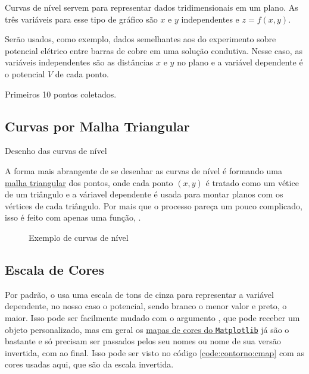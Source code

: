 Curvas de nível servem para representar dados tridimensionais em um plano. As três variáveis para esse tipo de gráfico são $x$ e $y$ independentes e $z = f(x,y)$.

Serão usados, como exemplo, dados semelhantes aos do experimento sobre potencial elétrico entre barras de cobre em uma solução condutiva. Nesse caso, as variáveis independentes são as distâncias $x$ e $y$ no plano e a variável dependente é o potencial $V$ de cada ponto.

\begin{table}[H]
    \centering
    
    \caption{Primeiros 10 pontos coletados.}
    \label{tab:contorno:dados}
\end{table}


\subsection{Curvas por Malha Triangular}
    \begin{listing}[H]
        \caption{Desenho das curvas de nível}
        \label{code:contorno:base}

    \end{listing}

    A forma mais abrangente de se desenhar as curvas de nível é formando uma \href{https://www.wikiwand.com/pt/Malha_triangular}{malha triangular} dos pontos, onde cada ponto $(x, y)$ é tratado como um vétice de um triângulo e a váriavel dependente é usada para montar planos com os vértices de cada triângulo. Por mais que o processo pareça um pouco complicado, isso é feito com apenas uma função, .

    \begin{figure}[H]
        \centering
        

        \caption{Exemplo de curvas de nível}
        \label{fig:contorno:base}
    \end{figure}


\subsection{Escala de Cores} \label{sec:contorno:cmap}

    Por padrão, o  usa uma escala de tons de cinza para representar a variável dependente, no nosso caso o potencial, sendo branco o menor valor e preto, o maior. Isso pode ser facilmente mudado com o argumento , que pode receber um objeto  personalizado, mas em geral os \href{https://matplotlib.org/3.1.0/gallery/color/colormap_reference.html}{mapas de cores do \texttt{Matplotlib}} já são o bastante e só precisam ser passados pelos seu nomes ou nome de sua versão invertida, com  ao final. Isso pode ser visto no código \ref{code:contorno:cmap} com as cores usadas aqui, que são da escala  invertida.

